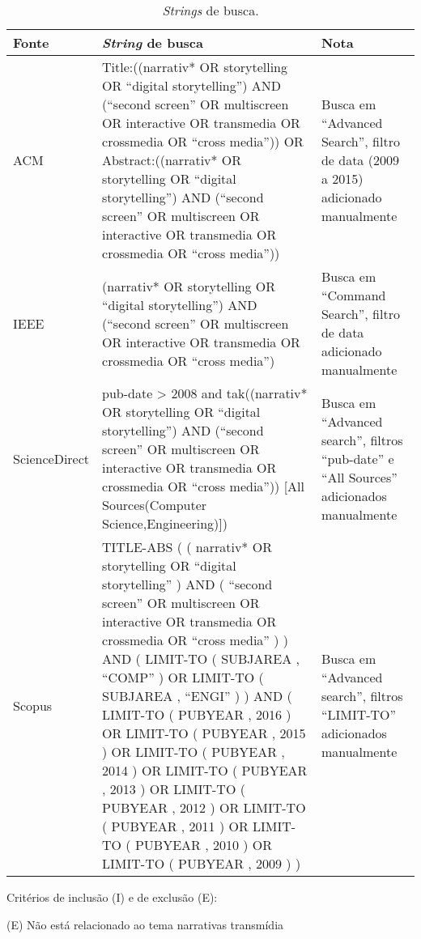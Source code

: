 \documentclass[
article,			%
11pt,				%
oneside,			%
a4paper,			%
english,			%
brazil,				%
sumario=tradicional
]{abntex2}
\begin{document}
  \begin{table}[htb]
    \ABNTEXfontereduzida
    \caption[\textit{Strings} de busca]{\textit{Strings} de busca.}
    \label{tab-queries2}
    \begin{tabular}{p{2.0cm}|p{9.3cm}|p{2.8cm}}
      \textbf{Fonte} & \textbf{\textit{String} de busca} & \textbf{Nota} \\
      \hline
      ACM & Title:((narrativ* OR storytelling OR ``digital storytelling'') AND (``second screen'' OR multiscreen OR interactive OR transmedia OR crossmedia OR ``cross media'')) OR Abstract:((narrativ* OR storytelling OR ``digital storytelling'') AND (``second screen'' OR multiscreen OR interactive OR transmedia OR crossmedia OR ``cross media'')) & Busca em ``Advanced Search'', filtro de data (2009 a 2015) adicionado manualmente \\
      \hline
      IEEE & (narrativ* OR storytelling OR ``digital storytelling'') AND (``second screen'' OR multiscreen OR interactive OR transmedia OR crossmedia OR ``cross media'') & Busca em ``Command Search'', filtro de data adicionado manualmente \\
      \hline
      ScienceDirect & pub-date > 2008 and tak((narrativ* OR storytelling OR ``digital storytelling'') AND (``second screen'' OR multiscreen OR interactive OR transmedia OR crossmedia OR ``cross media'')) [All Sources(Computer Science,Engineering)]) & Busca em ``Advanced search'', filtros ``pub-date'' e ``All Sources'' adicionados manualmente \\
      \hline
      Scopus & TITLE-ABS ( ( narrativ*  OR  storytelling  OR  ``digital storytelling'' )  AND  ( ``second screen''  OR  multiscreen  OR  interactive  OR  transmedia  OR  crossmedia  OR  ``cross media'' ) )  AND  ( LIMIT-TO ( SUBJAREA ,  ``COMP'' )  OR  LIMIT-TO ( SUBJAREA ,  ``ENGI'' ) )  AND  ( LIMIT-TO ( PUBYEAR ,  2016 )  OR  LIMIT-TO ( PUBYEAR ,  2015 )  OR  LIMIT-TO ( PUBYEAR ,  2014 )  OR  LIMIT-TO ( PUBYEAR ,  2013 )  OR  LIMIT-TO ( PUBYEAR ,  2012 )  OR  LIMIT-TO ( PUBYEAR ,  2011 )  OR  LIMIT-TO ( PUBYEAR ,  2010 )  OR  LIMIT-TO ( PUBYEAR ,  2009 ) ) & Busca em ``Advanced search'', filtros ``LIMIT-TO'' adicionados manualmente \\
    \end{tabular}
  \end{table}

  Critérios de inclusão (I) e de exclusão (E):

  (E) Não está relacionado ao tema narrativas transmídia
\end{document}
